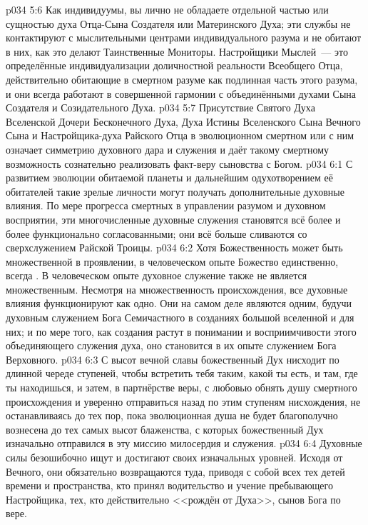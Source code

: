\vs p034 5:6 \pc Как индивидуумы, вы лично не обладаете отдельной частью или сущностью духа Отца\hyp{}Сына Создателя или Материнского Духа; эти службы не контактируют с мыслительными центрами индивидуального разума и не обитают в них, как это делают Таинственные Мониторы. Настройщики Мыслей~--- это определённые индивидуализации доличностной реальности Всеобщего Отца, действительно обитающие в смертном разуме как подлинная часть этого разума, и они всегда работают в совершенной гармонии с объединёнными духами Сына Создателя и Созидательного Духа.
\vs p034 5:7 Присутствие Святого Духа Вселенской Дочери Бесконечного Духа, Духа Истины Вселенского Сына Вечного Сына и Настройщика\hyp{}духа Райского Отца в эволюционном смертном или с ним означает симметрию духовного дара и служения и даёт такому смертному возможность сознательно реализовать факт\hyp{}веру сыновства с Богом.
\vs p034 6:1 С развитием эволюции обитаемой планеты и дальнейшим одухотворением её обитателей такие зрелые личности могут получать дополнительные духовные влияния. По мере прогресса смертных в управлении разумом и духовном восприятии, эти многочисленные духовные служения становятся всё более и более функционально согласованными; они всё больше сливаются со сверхслужением Райской Троицы.
\vs p034 6:2 Хотя Божественность может быть множественной в проявлении, в человеческом опыте Божество единственно, всегда . В человеческом опыте духовное служение также не является множественным. Несмотря на множественность происхождения, все духовные влияния функционируют как одно. Они на самом деле являются одним, будучи духовным служением Бога Семичастного в созданиях большой вселенной и для них; и по мере того, как создания растут в понимании и восприимчивости этого объединяющего служения духа, оно становится в их опыте служением Бога Верховного.
\vs p034 6:3 \pc С высот вечной славы божественный Дух нисходит по длинной череде ступеней, чтобы встретить тебя таким, какой ты есть, и там, где ты находишься, и затем, в партнёрстве веры, с любовью обнять душу смертного происхождения и уверенно отправиться назад по этим ступеням нисхождения, не останавливаясь до тех пор, пока эволюционная душа не будет благополучно вознесена до тех самых высот блаженства, с которых божественный Дух изначально отправился в эту миссию милосердия и служения.
\vs p034 6:4 Духовные силы безошибочно ищут и достигают своих изначальных уровней. Исходя от Вечного, они обязательно возвращаются туда, приводя с собой всех тех детей времени и пространства, кто принял водительство и учение пребывающего Настройщика, тех, кто действительно <<рождён от Духа>>, сынов Бога по вере.
